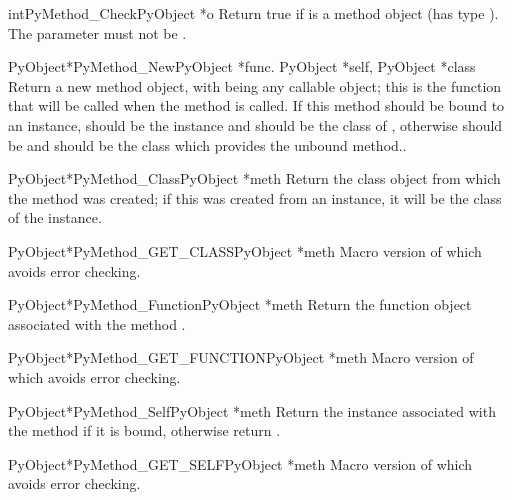 \begin{cfuncdesc}{int}{PyMethod_Check}{PyObject *o}
  Return true if  is a method object (has type
  ).  The parameter must not be \NULL.
\end{cfuncdesc}

\begin{cfuncdesc}{PyObject*}{PyMethod_New}{PyObject *func.
                                           PyObject *self, PyObject *class}
  Return a new method object, with  being any callable
  object; this is the function that will be called when the method is
  called.  If this method should be bound to an instance, 
  should be the instance and  should be the class of
  , otherwise  should be \NULL{} and 
  should be the class which provides the unbound method..
\end{cfuncdesc}

\begin{cfuncdesc}{PyObject*}{PyMethod_Class}{PyObject *meth}
  Return the class object from which the method  was
  created; if this was created from an instance, it will be the class
  of the instance.
\end{cfuncdesc}

\begin{cfuncdesc}{PyObject*}{PyMethod_GET_CLASS}{PyObject *meth}
  Macro version of  which avoids error
  checking.
\end{cfuncdesc}

\begin{cfuncdesc}{PyObject*}{PyMethod_Function}{PyObject *meth}
  Return the function object associated with the method .
\end{cfuncdesc}

\begin{cfuncdesc}{PyObject*}{PyMethod_GET_FUNCTION}{PyObject *meth}
  Macro version of  which avoids error
  checking.
\end{cfuncdesc}

\begin{cfuncdesc}{PyObject*}{PyMethod_Self}{PyObject *meth}
  Return the instance associated with the method  if it is
  bound, otherwise return \NULL.
\end{cfuncdesc}

\begin{cfuncdesc}{PyObject*}{PyMethod_GET_SELF}{PyObject *meth}
  Macro version of  which avoids error
  checking.
\end{cfuncdesc}


